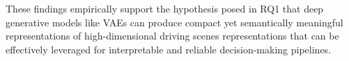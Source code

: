 These findings empirically support the hypothesis posed in RQ1 that deep generative models like VAEs can produce compact yet semantically meaningful representations of high-dimensional driving scenes representations that can be effectively leveraged for interpretable and reliable decision-making pipelines.









